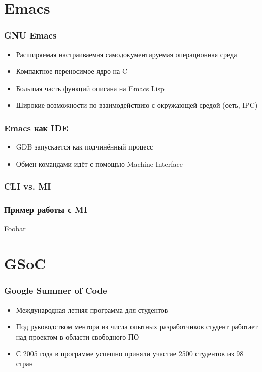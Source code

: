 \documentclass[onlymath]{beamer}
\begin{document}
\section{Emacs}
\begin{frame}
  \frametitle{GNU Emacs}

  \begin{itemize}
  \item Расширяемая настраиваемая самодокументируемая операционная
    среда
  \item Компактное переносимое ядро на C
  \item Большая часть функций описана на Emacs Lisp
  \item Широкие возможности по взаимодействию с окружающей средой
    (сеть, IPC)
  \end{itemize}
\end{frame}

\begin{frame}
  \frametitle{Emacs как IDE}

  \begin{itemize}
  \item GDB запускается как подчинённый процесс
  \item Обмен командами идёт с помощью Machine Interface
  \end{itemize}
\end{frame}

\begin{frame}
  \frametitle{CLI vs. MI}
  
\end{frame}

\begin{frame}
 \frametitle{Пример работы с MI}

Foobar
\end{frame}

\section{GSoC}
\begin{frame}
  \frametitle{Google Summer of Code}

  \begin{itemize}
  \item Международная летняя программа для студентов
  \item Под руководством ментора из числа опытных разработчиков
    студент работает над проектом в области свободного \textsc{ПО}
  \item С 2005 года в программе успешно приняли участие 2500 студентов
    из 98 стран
  \end{itemize}
\end{frame}
\end{document}
